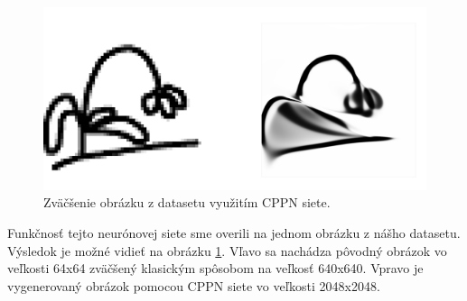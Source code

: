 \begin{figure}[!ht] 
	\centering 
	\includegraphics[width=.8\textwidth]{figures/cppn} 
	\caption{Zväčšenie obrázku z datasetu využitím CPPN siete.}
	\label{cppn}
\end{figure}

Funkčnosť tejto neurónovej siete sme overili na jednom obrázku z nášho datasetu.
Výsledok je možné vidieť na obrázku \ref{cppn}.
Vľavo sa nachádza pôvodný obrázok vo veľkosti 64x64 zväčšený klasickým spôsobom na veľkosť 640x640.
Vpravo je vygenerovaný obrázok pomocou CPPN siete vo veľkosti 2048x2048.
